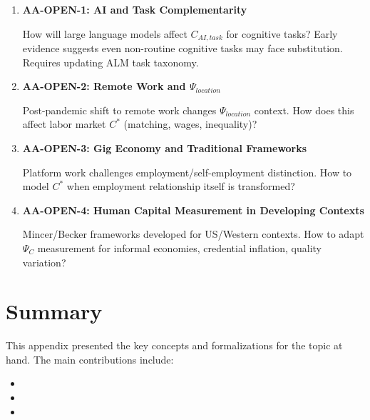 \begin{enumerate}
    \item \textbf{AA-OPEN-1: AI and Task Complementarity}

    How will large language models affect $C_{AI, task}$ for cognitive tasks? Early evidence suggests even non-routine cognitive tasks may face substitution. Requires updating ALM task taxonomy.

    \item \textbf{AA-OPEN-2: Remote Work and $\Psi_{location}$}

    Post-pandemic shift to remote work changes $\Psi_{location}$ context. How does this affect labor market $C^*$ (matching, wages, inequality)?

    \item \textbf{AA-OPEN-3: Gig Economy and Traditional Frameworks}

    Platform work challenges employment/self-employment distinction. How to model $C^*$ when employment relationship itself is transformed?

    \item \textbf{AA-OPEN-4: Human Capital Measurement in Developing Contexts}

    Mincer/Becker frameworks developed for US/Western contexts. How to adapt $\Psi_C$ measurement for informal economies, credential inflation, quality variation?
\end{enumerate}

% 
\section{Summary}
\label{sec:summary}

This appendix presented the key concepts and formalizations for the topic at hand.
The main contributions include:

\begin{itemize}
    \item [TODO: Key contribution 1]
    \item [TODO: Key contribution 2]
    \item [TODO: Key contribution 3]
\end{itemize}

